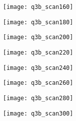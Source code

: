 		\begin{figure}[position = here]
			\begin{centering}
				\texttt{[image: q3b\_scan160]}\\
			\end{centering}
		\end{figure}
		\begin{figure}[position = here]
			\begin{centering}
				\texttt{[image: q3b\_scan180]}\\
			\end{centering}
		\end{figure}
		\begin{figure}[position = here]
			\begin{centering}
				\texttt{[image: q3b\_scan200]}\\
			\end{centering}
		\end{figure}
		\begin{figure}[position = here]
			\begin{centering}
				\texttt{[image: q3b\_scan220]}\\
			\end{centering}
		\end{figure}
		\begin{figure}[position = here]
			\begin{centering}
				\texttt{[image: q3b\_scan240]}\\
			\end{centering}
		\end{figure}
		\begin{figure}[position = here]
			\begin{centering}
				\texttt{[image: q3b\_scan260]}\\
			\end{centering}
		\end{figure}
		\begin{figure}[position = here]
			\begin{centering}
				\texttt{[image: q3b\_scan280]}\\
			\end{centering}
		\end{figure}
		\begin{figure}[position = here]
			\begin{centering}
				\texttt{[image: q3b\_scan300]}\\
			\end{centering}
		\end{figure}
